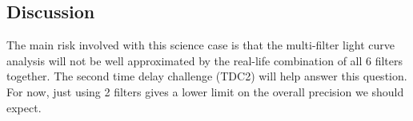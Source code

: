 %
%
%
%
%
%


\subsection{Discussion}
\label{sec:\secname:discussion}


The main risk involved with this science case
is that the multi-filter light curve analysis will not be well approximated by
the real-life combination of all 6 filters together.
The second time delay challenge (TDC2) will help answer this
question.  For now, just using 2 filters gives a lower limit on the
overall precision we should expect.

